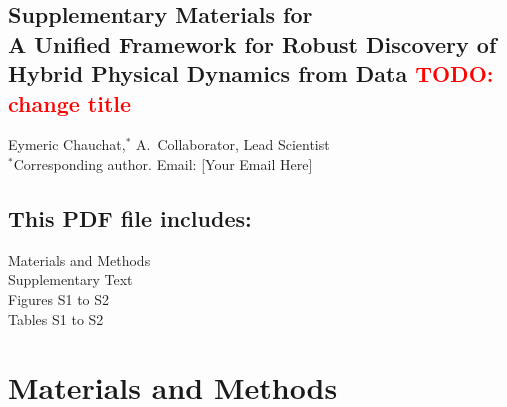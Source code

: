 \documentclass[12pt]{article}
\newcommand{\TODO}[1]{\textbf{\textcolor{red}{\Large TODO: \normalsize #1}}}
\def\scititle{
	A Unified Framework for Robust Discovery of Hybrid Physical Dynamics from Data \TODO{change title}
}
\begin{document}

\newpage


\renewcommand{\thefigure}{S\arabic{figure}}
\renewcommand{\thetable}{S\arabic{table}}
\renewcommand{\theequation}{S\arabic{equation}}
\renewcommand{\thepage}{S\arabic{page}}
\setcounter{figure}{0}
\setcounter{table}{0}
\setcounter{equation}{0}
\setcounter{page}{1} %



\begin{center}
\section*{Supplementary Materials for\\ \scititle}

Eymeric Chauchat,$^{\ast}$ A.~Collaborator, Lead Scientist\\
\small$^\ast$Corresponding author. Email: [Your Email Here]
\end{center}

\subsection*{This PDF file includes:}
Materials and Methods\\
Supplementary Text\\
Figures S1 to S2\\
Tables S1 to S2

\newpage


\section*{Materials and Methods}
\end{document}
